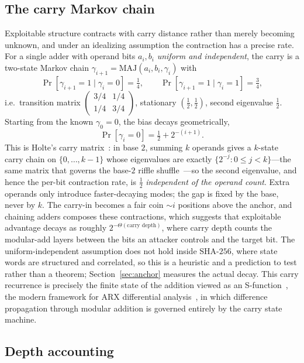\documentclass[11pt]{article}
\theoremstyle{remark}
\newcommand{\SHA}{\mathrm{SHA\text{-}256}}
\newcommand{\MAJ}{\mathrm{MAJ}}
\begin{document}
\subsection{The carry Markov chain}\label{sec:markov}

Exploitable structure contracts with carry distance rather than merely
becoming unknown, and under an idealizing assumption the contraction has
a precise rate. For a single adder with operand bits $a_i,b_i$
\emph{uniform and independent}, the carry is a two-state Markov chain
$\gamma_{i+1} = \MAJ(a_i,b_i,\gamma_i)$ with
\[
  \Pr[\gamma_{i+1}{=}1\mid \gamma_i{=}0] = \tfrac14,
  \qquad
  \Pr[\gamma_{i+1}{=}1\mid \gamma_i{=}1] = \tfrac34,
\]
i.e.\ transition matrix $\left(\begin{smallmatrix}3/4 & 1/4\\ 1/4 &
3/4\end{smallmatrix}\right)$, stationary $(\tfrac12,\tfrac12)$, second
eigenvalue $\tfrac12$. Starting from the known $\gamma_0 = 0$, the bias
decays geometrically,
\[
  \Pr[\gamma_i = 0] = \tfrac12 + 2^{-(i+1)}.
\]
This is Holte's carry matrix~\cite{holte}: in base $2$, summing $k$
operands gives a $k$-state carry chain on $\{0,\dots,k-1\}$ whose
eigenvalues are exactly $\{2^{-j}:0\le j<k\}$---the same matrix that
governs the base-$2$ riffle shuffle~\cite{diaconisfulman}---so the second
eigenvalue, and hence the per-bit contraction rate, is $\tfrac12$
\emph{independent of the operand count}. Extra operands only introduce
faster-decaying modes; the gap is fixed by the base, never by $k$.
The carry-in becomes a fair coin $\sim i$ positions above the anchor, and
chaining adders composes these contractions, which suggests that
exploitable advantage decays as roughly $2^{-\Theta(\text{carry depth})}$,
where carry depth counts the modular-add layers between the bits an
attacker controls and the target bit. The uniform-independent assumption
does not hold inside $\SHA$, where state words are structured and
correlated, so this is a heuristic and a prediction to test rather than a
theorem; Section~\ref{sec:anchor} measures the actual decay. This carry
recurrence is precisely the finite state of the addition viewed as an
S-function~\cite{sfunction}, the modern framework for ARX differential
analysis~\cite{arx}, in which difference propagation through modular
addition is governed entirely by the carry state machine.

\subsection{Depth accounting}\label{sec:accounting}
\end{document}
